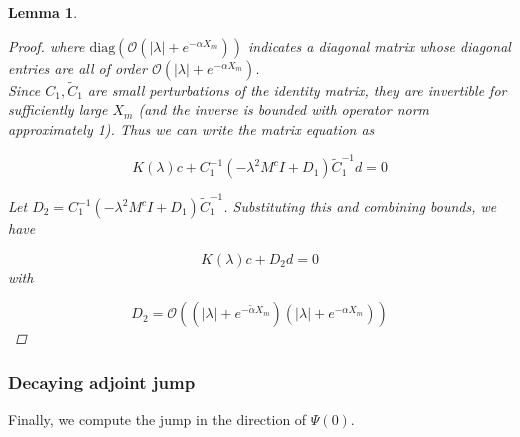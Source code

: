 \documentclass[12pt]{article}
\newtheorem{lemma}{Lemma}
\begin{document}
\begin{lemma}
\begin{proof}
where $\text{diag}(\mathcal{O}(|\lambda| + e^{-\alpha X_m}))$ indicates a diagonal matrix whose diagonal entries are all of order $\mathcal{O}(|\lambda| + e^{-\alpha X_m})$.\\

Since $C_1, \tilde{C}_1$ are small perturbations of the identity matrix, they are invertible for sufficiently large $X_m$ (and the inverse is bounded with operator norm approximately 1). Thus we can write the matrix equation as

\[
K(\lambda) c + C_1^{-1} (-\lambda^2 M^c I + D_1) \tilde{C}_1^{-1}d = 0
\]

Let $D_2 = C_1^{-1} (-\lambda^2 M^c I + D_1) \tilde{C}_1^{-1}$. Substituting this and combining bounds, we have

\[
K(\lambda) c + D_2 d = 0
\]
with

\[
D_2 = \mathcal{O}((|\lambda| + e^{-\tilde{\alpha} X_m})(|\lambda| + e^{-\alpha X_m}))
\]

\end{proof}
\end{lemma}

\subsubsection{Decaying adjoint jump}

Finally, we compute the jump in the direction of $\Psi(0)$.
\end{document}
